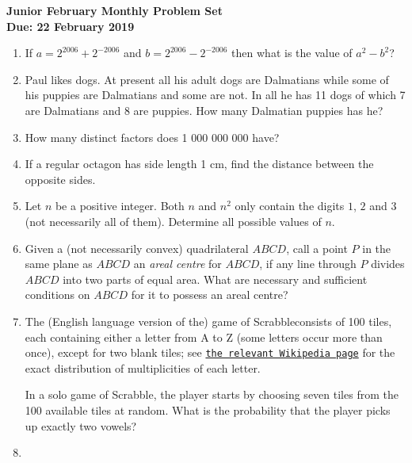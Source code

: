 \documentclass{article}
\begin{document}
\begin{center}
\textbf{\Large Junior February Monthly Problem Set}
\\ \vspace{1em}
\textbf{\large Due: 22 February 2019}
\end{center}

\vspace{12pt}

\begin{enumerate}[1.]

\item %
If $a = 2^{2006} + 2^{-2006}$ and $b = 2^{2006} - 2^{-2006}$ then what is the value of $a^2 - b^2$?


\item %
Paul likes dogs. At present all his adult dogs are Dalmatians while some of his puppies are Dalmatians and some are not. In all he has 11 dogs of which 7 are Dalmatians and 8 are puppies. How many Dalmatian puppies has he?


\item %
How many distinct factors does 1 000 000 000 have?


\item %
If a regular octagon has side length 1 cm, find the distance between the opposite sides.


\item %
Let $n$ be a positive integer. Both $n$ and $n^2$ only contain the digits $1$, $2$ and $3$ (not necessarily all of them). Determine all possible values of $n$.


\item %
Given a (not necessarily convex) quadrilateral $ABCD$, call a point $P$ in the same plane as $ABCD$ an \emph{areal centre} for $ABCD$, if any line through $P$ divides $ABCD$ into two parts of equal area. What are necessary and sufficient conditions on $ABCD$ for it to possess an areal centre?


\item %
The (English language version of the) game of Scrabble\texttrademark consists of 100 tiles, each containing either a letter from A to Z (some letters occur more than once), except for two blank tiles; see \href{https://en.wikipedia.org/wiki/Scrabble_letter_distributions#English}{\texttt{the relevant Wikipedia page}} for the exact distribution of multiplicities of each letter.

In a solo game of Scrabble, the player starts by choosing seven tiles from the 100 available tiles at random. What is the probability that the player picks up exactly two vowels?


\item %


\end{enumerate}
\end{document}
